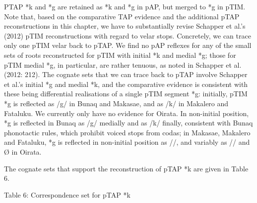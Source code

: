 \documentclass[a4paper]{article}
\begin{document}
PTAP *k and *g are retained as *k and *g in pAP, but merged to *g in pTIM. Note that, based on the comparative TAP evidence and the additional pTAP reconstructions in this chapter, we have to substantially revise Schapper et al.{\textquoteright}s (2012) pTIM reconstructions with regard to velar stops. Concretely, we can trace only one pTIM velar back to pTAP. We find no pAP reflexes for any of the small sets of roots reconstructed for pTIM with initial *k and medial *g; those for pTIM medial *g, in particular, are rather tenuous, as noted in Schapper et al. (2012: 212). The cognate sets that we can trace back to pTAP involve Schapper et al.{\textquoteright}s initial *g and medial *k, and the comparative evidence is consistent with these being differential realisations of a single pTIM segment *g: initially, pTIM *g is reflected as /g/ in Bunaq and Makasae, and as /k/ in Makalero and Fataluku. We currently only have no evidence for Oirata. In non-initial position, *g is reflected in Bunaq as /g/ medially and as /k/ finally, consistent with Bunaq phonotactic rules, which prohibit voiced stops from codas; in Makasae, Makalero and Fataluku, *g is reflected in non-initial position as /{\textglotstop}/, and variably as /{\textglotstop}/ and {\O} in Oirata. 

The cognate sets that support the reconstruction of pTAP *k are given in Table 6. 

{\centering
Table 6: Correspondence set for pTAP *k
\par}
\end{document}
